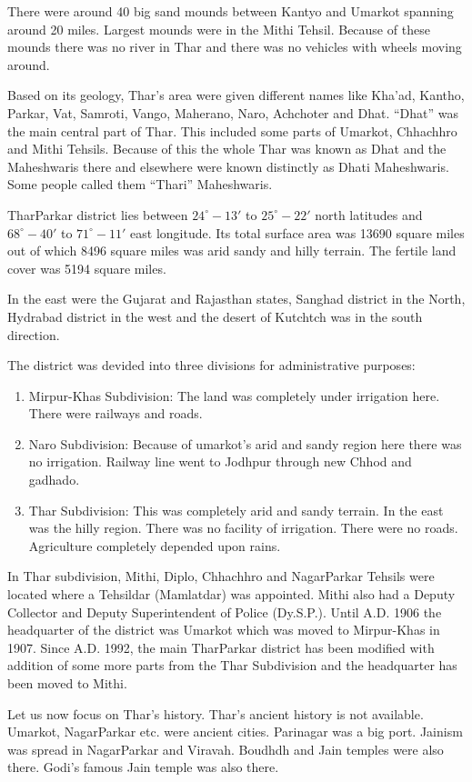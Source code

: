 There were around 40 big sand mounds between Kantyo and Umarkot spanning around 20 miles. Largest mounds were in the Mithi Tehsil. Because of these mounds there was no river in Thar and there was no vehicles with wheels moving around.

Based on its geology, Thar's area were given different names like Kha'ad, Kantho, Parkar, Vat, Samroti, Vango, Maherano, Naro, Achchoter and Dhat. ``Dhat'' was the main central part of Thar. This included some parts of Umarkot, Chhachhro and Mithi Tehsils. Because of this the whole Thar was known as Dhat and the Maheshwaris there and elsewhere were known distinctly as Dhati Maheshwaris. Some people called them ``Thari'' Maheshwaris.

TharParkar district lies between $24^\circ-13'$ to $25^\circ-22'$ north latitudes and $68^\circ-40'$ to $71^\circ-11'$ east longitude. Its total surface area was 13690 square miles out of which 8496 square miles was arid sandy and hilly terrain. The fertile land cover was 5194 square miles.

In the east were the Gujarat and Rajasthan states, Sanghad district in the North, Hydrabad district in the west and the desert of Kutchtch was in the south direction.

The district was devided into three divisions for administrative purposes:
\begin{enumerate}
\item Mirpur-Khas Subdivision: The land was completely under irrigation here. There were railways and roads.
\item Naro Subdivision: Because of umarkot's arid and sandy region here there was no irrigation. Railway line went to Jodhpur through new Chhod and gadhado.
\item Thar Subdivision: This was completely arid and sandy terrain. In the east was the hilly region. There was no facility of irrigation. There were no roads. Agriculture completely depended upon rains.
\end{enumerate}
In Thar subdivision, Mithi, Diplo, Chhachhro and NagarParkar Tehsils were located where a Tehsildar (Mamlatdar) was appointed. Mithi also had a Deputy Collector and Deputy Superintendent of Police (Dy.S.P.). Until A.D. 1906 the headquarter of the district was Umarkot which was moved to Mirpur-Khas in 1907. Since A.D. 1992, the main TharParkar district has been modified with addition of some more parts from the Thar Subdivision and the headquarter has been moved to Mithi.

Let us now focus on Thar's history. Thar's ancient history is not available. Umarkot, NagarParkar etc. were ancient cities. Parinagar was a big port. Jainism was spread in NagarParkar and Viravah. Boudhdh and Jain temples were also there. Godi's famous Jain temple was also there.

